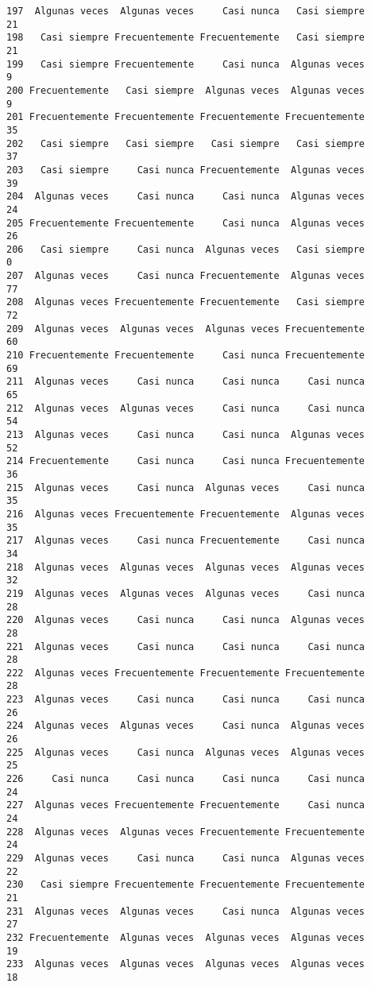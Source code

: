 \documentclass[
  letterpaper,
  DIV=11,
  numbers=noendperiod]{scrartcl}
\begin{document}
\begin{verbatim}
197  Algunas veces  Algunas veces     Casi nunca   Casi siempre      21
198   Casi siempre Frecuentemente Frecuentemente   Casi siempre      21
199   Casi siempre Frecuentemente     Casi nunca  Algunas veces       9
200 Frecuentemente   Casi siempre  Algunas veces  Algunas veces       9
201 Frecuentemente Frecuentemente Frecuentemente Frecuentemente      35
202   Casi siempre   Casi siempre   Casi siempre   Casi siempre      37
203   Casi siempre     Casi nunca Frecuentemente  Algunas veces      39
204  Algunas veces     Casi nunca     Casi nunca  Algunas veces      24
205 Frecuentemente Frecuentemente     Casi nunca  Algunas veces      26
206   Casi siempre     Casi nunca  Algunas veces   Casi siempre       0
207  Algunas veces     Casi nunca Frecuentemente  Algunas veces      77
208  Algunas veces Frecuentemente Frecuentemente   Casi siempre      72
209  Algunas veces  Algunas veces  Algunas veces Frecuentemente      60
210 Frecuentemente Frecuentemente     Casi nunca Frecuentemente      69
211  Algunas veces     Casi nunca     Casi nunca     Casi nunca      65
212  Algunas veces  Algunas veces     Casi nunca     Casi nunca      54
213  Algunas veces     Casi nunca     Casi nunca  Algunas veces      52
214 Frecuentemente     Casi nunca     Casi nunca Frecuentemente      36
215  Algunas veces     Casi nunca  Algunas veces     Casi nunca      35
216  Algunas veces Frecuentemente Frecuentemente  Algunas veces      35
217  Algunas veces     Casi nunca Frecuentemente     Casi nunca      34
218  Algunas veces  Algunas veces  Algunas veces  Algunas veces      32
219  Algunas veces  Algunas veces  Algunas veces     Casi nunca      28
220  Algunas veces     Casi nunca     Casi nunca  Algunas veces      28
221  Algunas veces     Casi nunca     Casi nunca     Casi nunca      28
222  Algunas veces Frecuentemente Frecuentemente Frecuentemente      28
223  Algunas veces     Casi nunca     Casi nunca     Casi nunca      26
224  Algunas veces  Algunas veces     Casi nunca  Algunas veces      26
225  Algunas veces     Casi nunca  Algunas veces  Algunas veces      25
226     Casi nunca     Casi nunca     Casi nunca     Casi nunca      24
227  Algunas veces Frecuentemente Frecuentemente     Casi nunca      24
228  Algunas veces  Algunas veces Frecuentemente Frecuentemente      24
229  Algunas veces     Casi nunca     Casi nunca  Algunas veces      22
230   Casi siempre Frecuentemente Frecuentemente Frecuentemente      21
231  Algunas veces  Algunas veces     Casi nunca  Algunas veces      27
232 Frecuentemente  Algunas veces  Algunas veces  Algunas veces      19
233  Algunas veces  Algunas veces  Algunas veces  Algunas veces      18

\end{verbatim}
\end{document}

